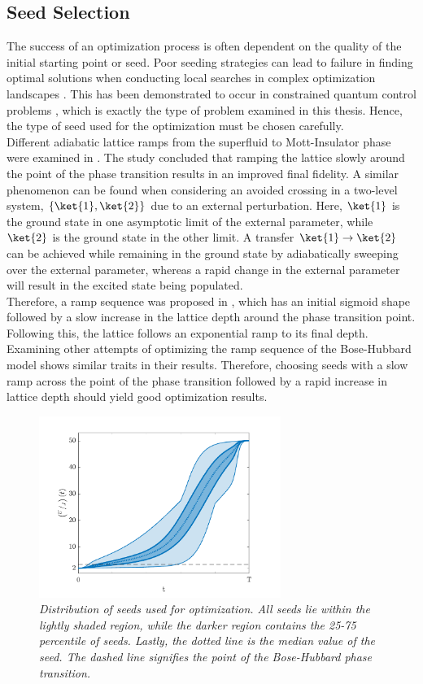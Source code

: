 \subsection{Seed Selection}
The success of an optimization process is often dependent on the quality of the initial starting point or seed. Poor seeding strategies can lead to failure in finding optimal solutions when conducting local searches in complex optimization landscapes \cite{Sorensen2016}. This has been demonstrated to occur in constrained quantum control problems \cite{Zhdanov2015}, which is exactly the type of problem examined in this thesis. Hence, the type of seed used for the optimization must be chosen carefully.\\ 
Different adiabatic lattice ramps from the superfluid to Mott-Insulator phase were examined in \cite{Zakrzewski2009}. The study concluded that ramping the lattice slowly around the point of the phase transition results in an improved final fidelity. A similar phenomenon can be found when considering an avoided crossing in a two-level system, $\{ \ket{1} , \ket{2} \}$ due to an external perturbation. Here, $\ket{1}$ is the ground state in one asymptotic limit of the external parameter, while $\ket{2}$ is the ground state in the other limit. A transfer $\ket{1} \to \ket{2}$ can be achieved while remaining in the ground state by adiabatically sweeping over the external parameter, whereas a rapid change in the external parameter will result in the excited state being populated.\\
Therefore, a ramp sequence was proposed in \cite{Zakrzewski2009}, which has an initial sigmoid shape followed by a slow increase in the lattice depth around the phase transition point. Following this, the lattice follows an exponential ramp to its final depth. Examining other attempts of optimizing the ramp sequence of the Bose-Hubbard model \cite{Doria2011,FrankBloch} shows similar traits in their results. Therefore, choosing seeds with a slow ramp across the point of the phase transition followed by a rapid increase in lattice depth should yield good optimization results.
\begin{figure}[h!]
    \centering
    \includegraphics[width=0.7\textwidth]{Figures/LinSigSeed.pdf}
    \caption{\textit{Distribution of seeds used for optimization. All seeds lie within the lightly shaded region, while the darker region contains the 25-75 percentile of seeds. Lastly, the dotted line is the median value of the seed. The dashed line signifies the point of the Bose-Hubbard phase transition.}}
    \label{fig:LinSigSeed}
\end{figure}

